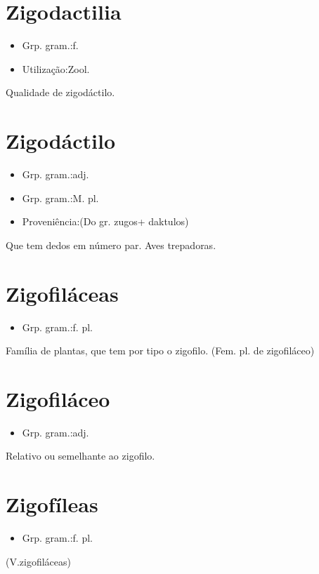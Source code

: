 \section{Zigodactilia}
\begin{itemize}
\item {Grp. gram.:f.}
\end{itemize}
\begin{itemize}
\item {Utilização:Zool.}
\end{itemize}
Qualidade de zigodáctilo.
\section{Zigodáctilo}
\begin{itemize}
\item {Grp. gram.:adj.}
\end{itemize}
\begin{itemize}
\item {Grp. gram.:M. pl.}
\end{itemize}
\begin{itemize}
\item {Proveniência:(Do gr. \textunderscore zugos\textunderscore  + \textunderscore daktulos\textunderscore )}
\end{itemize}
Que tem dedos em número par.
Aves trepadoras.
\section{Zigofiláceas}
\begin{itemize}
\item {Grp. gram.:f. pl.}
\end{itemize}
Família de plantas, que tem por tipo o zigofilo.
(Fem. pl. de \textunderscore zigofiláceo\textunderscore )
\section{Zigofiláceo}
\begin{itemize}
\item {Grp. gram.:adj.}
\end{itemize}
Relativo ou semelhante ao zigofilo.
\section{Zigofíleas}
\begin{itemize}
\item {Grp. gram.:f. pl.}
\end{itemize}
(V.zigofiláceas)
